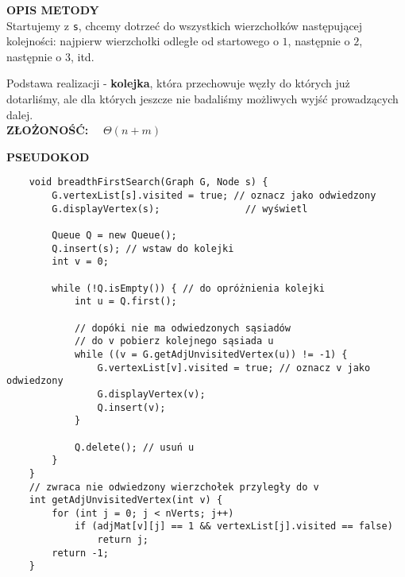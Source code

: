 \documentclass[algorytmy.tex]{subfiles}
\begin{document}

    \textbf{OPIS METODY}\\

    Startujemy z \texttt{s}, chcemy dotrzeć do wszystkich wierzchołków
    następującej kolejności: najpierw wierzchołki odległe od startowego o $1$,
    następnie o $2$, następnie o $3$, itd.

    Podstawa realizacji - \textbf{kolejka}, która przechowuje węzły do których
    już dotarliśmy, ale dla których jeszcze nie badaliśmy możliwych wyjść
    prowadzących dalej. \\

    \textbf{ZŁOŻONOŚĆ:} ~~$\Theta(n + m)$


    \textbf{PSEUDOKOD}
    \begin{verbatim}
    void breadthFirstSearch(Graph G, Node s) {
        G.vertexList[s].visited = true; // oznacz jako odwiedzony
        G.displayVertex(s);               // wyświetl

        Queue Q = new Queue();
        Q.insert(s); // wstaw do kolejki
        int v = 0;

        while (!Q.isEmpty()) { // do opróżnienia kolejki
            int u = Q.first();

            // dopóki nie ma odwiedzonych sąsiadów
            // do v pobierz kolejnego sąsiada u
            while ((v = G.getAdjUnvisitedVertex(u)) != -1) {
                G.vertexList[v].visited = true; // oznacz v jako odwiedzony
                G.displayVertex(v);
                Q.insert(v);
            }

            Q.delete(); // usuń u
        }
    }
    // zwraca nie odwiedzony wierzchołek przyległy do v
    int getAdjUnvisitedVertex(int v) {
        for (int j = 0; j < nVerts; j++)
            if (adjMat[v][j] == 1 && vertexList[j].visited == false)
                return j;
        return -1;
    }
    \end{verbatim}
\end{document}
